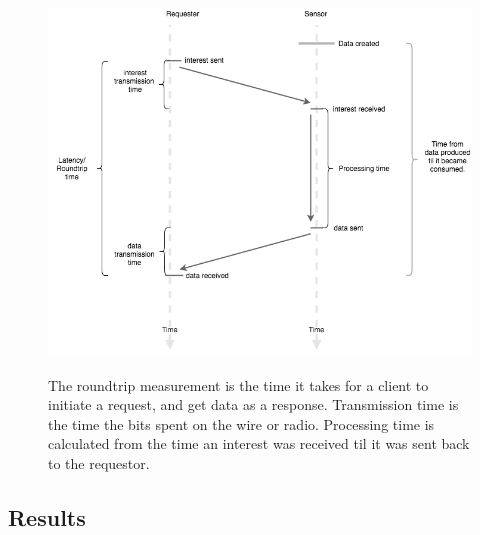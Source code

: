 \begin{figure}
    \centering
    \includegraphics[width=\textwidth,height=10cm,keepaspectratio]{figures/latency.png}
    \caption{The roundtrip measurement is the time it takes for a client to initiate a request, and get data as a response. Transmission time is the time the bits spent on the wire or radio. Processing time is calculated from the time an interest was received til it was sent back to the requestor.}
    \label{fig:latency}
\end{figure}



\subsection{Results}

